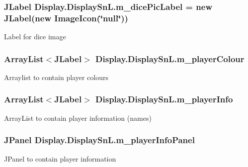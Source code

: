 \subsubsection[{m\+\_\+dice\+Pic\+Label}]{\setlength{\rightskip}{0pt plus 5cm}J\+Label Display.\+Display\+Sn\+L.\+m\+\_\+dice\+Pic\+Label = new J\+Label(new Image\+Icon(\char`\"{}null\char`\"{}))\hspace{0.3cm}{\ttfamily [private]}}\label{class_display_1_1_display_sn_l_aafb6d505956de58bbd229a789342ef19}
Label for dice image \hypertarget{class_display_1_1_display_sn_l_a075a16b363ea3d1e75e589fe11b2b0e7}{}
\subsubsection[{m\+\_\+player\+Colour}]{\setlength{\rightskip}{0pt plus 5cm}Array\+List$<$J\+Label$>$ Display.\+Display\+Sn\+L.\+m\+\_\+player\+Colour\hspace{0.3cm}{\ttfamily [private]}}\label{class_display_1_1_display_sn_l_a075a16b363ea3d1e75e589fe11b2b0e7}
Arraylist to contain player colours \hypertarget{class_display_1_1_display_sn_l_ad4d75120b08606844b7fa63e2990928b}{}
\subsubsection[{m\+\_\+player\+Info}]{\setlength{\rightskip}{0pt plus 5cm}Array\+List$<$J\+Label$>$ Display.\+Display\+Sn\+L.\+m\+\_\+player\+Info\hspace{0.3cm}{\ttfamily [private]}}\label{class_display_1_1_display_sn_l_ad4d75120b08606844b7fa63e2990928b}
Array\+List to contain player information (names) \hypertarget{class_display_1_1_display_sn_l_a7afa5f7ca8e697b64de4de4246f2c2a8}{}
\subsubsection[{m\+\_\+player\+Info\+Panel}]{\setlength{\rightskip}{0pt plus 5cm}J\+Panel Display.\+Display\+Sn\+L.\+m\+\_\+player\+Info\+Panel\hspace{0.3cm}{\ttfamily [private]}}\label{class_display_1_1_display_sn_l_a7afa5f7ca8e697b64de4de4246f2c2a8}
J\+Panel to contain player information \hypertarget{class_display_1_1_display_sn_l_aa4b30638e1d8f99b5052652ea02d6365}{}
